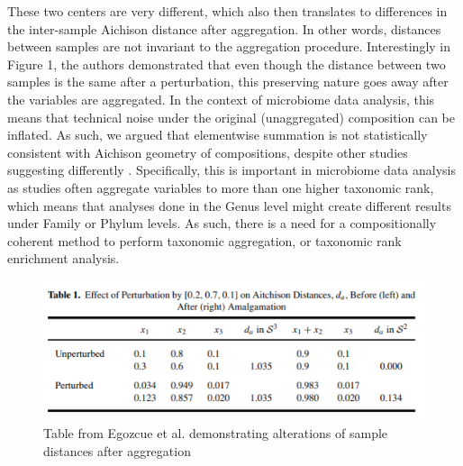 \documentclass{article}
\begin{document}
These two centers are very different, which also then translates to differences in the inter-sample Aichison distance after aggregation. In other words, distances between samples are not invariant to the aggregation procedure. Interestingly in Figure 1, the authors demonstrated that even though the distance between two samples is the same after a perturbation, this preserving nature goes away after the variables are aggregated. In the context of microbiome data analysis, this means that technical noise under the original (unaggregated) composition can be inflated. As such, we argued that elementwise summation is not statistically consistent with Aichison geometry of compositions, despite other studies suggesting differently \cite{greenacre2020}. Specifically, this is important in microbiome data analysis as studies often aggregate variables to more than one higher taxonomic rank, which means that analyses done in the Genus level might create different results under Family or Phylum levels. As such, there is a need for a compositionally coherent method to perform taxonomic aggregation, or taxonomic rank enrichment analysis.      

\begin{figure}[!htb]
    \centering
    \includegraphics[scale=1.0]{ezogue_tab1.png}
    \caption{Table from Egozcue et al. demonstrating alterations of sample distances after aggregation}
    \label{fig:ezogue_tab1}
\end{figure}
\end{document}
